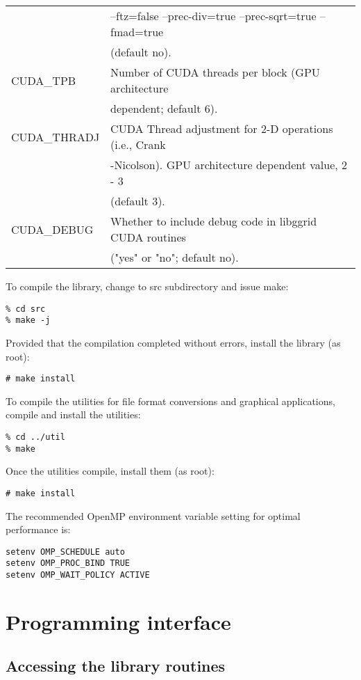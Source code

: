 \documentclass[12pt,letterpaper]{report}
\begin{document}
\begin{tabular}{ll}
               & --ftz=false --prec-div=true --prec-sqrt=true --fmad=true\\
               & (default no).\\
CUDA\_TPB & Number of CUDA threads per block (GPU architecture\\
          & dependent; default 6).\\
CUDA\_THRADJ & CUDA Thread adjustment for 2-D operations (i.e., Crank\\
             & -Nicolson). GPU architecture dependent value, 2 - 3\\
             & (default 3).\\
CUDA\_DEBUG & Whether to include debug code in libggrid CUDA routines\\
            & ("yes" or "no"; default no).\\
\end{tabular}

\noindent
To compile the library, change to src subdirectory and issue make:
\begin{verbatim}
% cd src
% make -j
\end{verbatim}
Provided that the compilation completed without errors, install the library (as root):
\begin{verbatim}
# make install
\end{verbatim}
To compile the utilities for file format conversions and graphical applications, compile and install the utilities:
\begin{verbatim}
% cd ../util
% make
\end{verbatim}
Once the utilities compile, install them (as root):
\begin{verbatim}
# make install
\end{verbatim}

\noindent
The recommended OpenMP environment variable setting for optimal performance is:
\begin{verbatim}
setenv OMP_SCHEDULE auto
setenv OMP_PROC_BIND TRUE
setenv OMP_WAIT_POLICY ACTIVE
\end{verbatim}

\chapter{Programming interface}

\section{Accessing the library routines}
\end{document}
